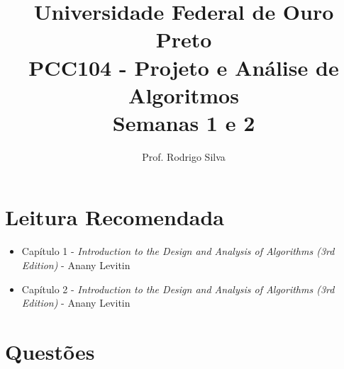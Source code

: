 \documentclass{article}
\title{\vspace{-2 cm}Universidade Federal de Ouro Preto \\ PCC104 - Projeto e Análise de Algoritmos \\ Semanas 1 e 2}
\author{Prof. Rodrigo Silva}
\begin{document}
\maketitle


\section{Leitura Recomendada}

\begin{itemize}
    \item Capítulo 1 - \textit{Introduction to the Design and Analysis of Algorithms (3rd Edition)} - Anany Levitin 
    \item Capítulo 2 - \textit{Introduction to the Design and Analysis of Algorithms (3rd Edition)} - Anany Levitin 
\end{itemize}

\section{Questões}
\end{document}
